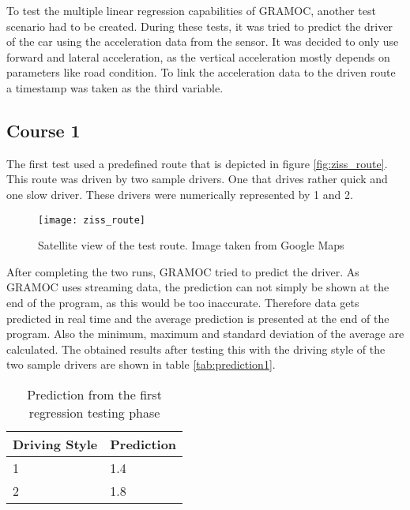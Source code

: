 
To test the multiple linear regression capabilities of GRAMOC, another test scenario had to be created. During these tests, it was tried to predict the driver of the car using the acceleration data from the sensor. It was decided to only use forward and lateral acceleration, as the vertical acceleration mostly depends on parameters like road condition. To link the acceleration data to the driven route a timestamp was taken as the third variable.

\subsection{Course 1}

The first test used a predefined route that is depicted in figure \vref{fig:ziss_route}. This route was driven by two sample drivers. One that drives rather quick and one slow driver. These drivers were numerically represented by 1 and 2.

\begin{figure}[H]
    \centering
    \texttt{[image: ziss\_route]}
    \caption{Satellite view of the test route. Image taken from Google Maps}
    \label{fig:ziss_route}
\end{figure}

After completing the two runs, GRAMOC tried to predict the driver. As GRAMOC uses streaming data, the prediction can not simply be shown at the end of the program, as this would be too inaccurate. Therefore data gets predicted in real time and the average prediction is presented at the end of the program. Also the minimum, maximum and standard deviation of the average are calculated. The obtained results after testing this with the driving style of the two sample drivers are shown in table \vref{tab:prediction1}.

\begin{table}[H]
\centering
\begin{tabular}{|l|l|}
\hline
\textbf{Driving Style} & \textbf{Prediction} \\ \hline
1                      & 1.4                 \\ \hline
2                      & 1.8                 \\ \hline
\end{tabular}
\caption{Prediction from the first regression testing phase}
\label{tab:prediction1}
\end{table}


